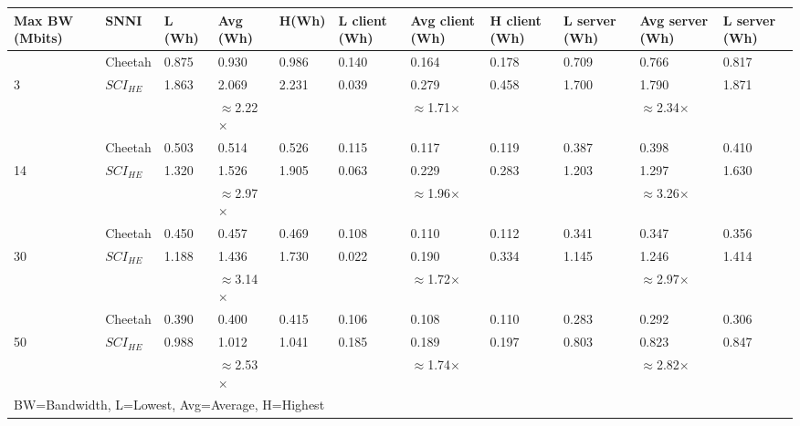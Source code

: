 \begin{tabular}{lllllllllll}
Max BW (Mbits) & SNNI    & L (Wh) & Avg (Wh) & H(Wh) & L client (Wh) & Avg client (Wh) & H client (Wh) & L server (Wh) & Avg server (Wh) & L server (Wh) \\ \hline
               & Cheetah & 0.875  & 0.930    & 0.986 & 0.140         & 0.164           & 0.178         & 0.709         & 0.766           & 0.817         \\
3              & $SCI_{HE}$ & 1.863  & 2.069    & 2.231 & 0.039         & 0.279           & 0.458         & 1.700         & 1.790           & 1.871         \\ \cline{3-11} 
               &         &        & $\approx$2.22$\times$    &       &               & $\approx$1.71$\times$           &               &               & $\approx$2.34$\times$           &               \\ \hline
               & Cheetah & 0.503  & 0.514    & 0.526 & 0.115         & 0.117           & 0.119         & 0.387         & 0.398           & 0.410         \\
14             & $SCI_{HE}$ & 1.320  & 1.526    & 1.905 & 0.063         & 0.229           & 0.283         & 1.203         & 1.297           & 1.630         \\ \cline{3-11} 
               &         &        & $\approx$2.97$\times$    &       &               & $\approx$1.96$\times$           &               &               & $\approx$3.26$\times$           &               \\ \hline
               & Cheetah & 0.450  & 0.457    & 0.469 & 0.108         & 0.110           & 0.112         & 0.341         & 0.347           & 0.356         \\
30             & $SCI_{HE}$ & 1.188  & 1.436    & 1.730 & 0.022         & 0.190           & 0.334         & 1.145         & 1.246           & 1.414         \\ \cline{3-11} 
               &         &        & $\approx$3.14$\times$    &       &               & $\approx$1.72$\times$           &               &               & $\approx$2.97$\times$           &               \\ \hline
               & Cheetah & 0.390  & 0.400    & 0.415 & 0.106         & 0.108           & 0.110         & 0.283         & 0.292           & 0.306         \\
50             & $SCI_{HE}$ & 0.988  & 1.012    & 1.041 & 0.185         & 0.189           & 0.197         & 0.803         & 0.823           & 0.847         \\ \cline{3-11} 
               &         &        & $\approx$2.53$\times$    &       &               & $\approx$1.74$\times$           &               &               & $\approx$2.82$\times$           &               \\ \hline
\multicolumn{11}{l}{BW=Bandwidth, L=Lowest, Avg=Average, H=Highest}                                                                                     
\end{tabular}
